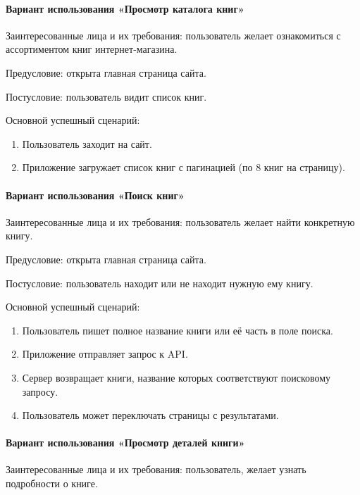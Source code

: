 \paragraph{Вариант использования «Просмотр каталога книг»}

Заинтересованные лица и их требования: пользователь желает ознакомиться с ассортиментом книг интернет-магазина.

Предусловие: открыта главная страница сайта.

Постусловие: пользователь видит список книг.

Основной успешный сценарий:

\begin{enumerate}
	\item Пользователь заходит на сайт.
	\item Приложение загружает список книг с пагинацией (по 8 книг на страницу).
\end{enumerate}


\paragraph{Вариант использования «Поиск книг»}

Заинтересованные лица и их требования: пользователь желает найти конкретную книгу.

Предусловие: открыта главная страница сайта.

Постусловие: пользователь находит или не находит нужную ему книгу.

Основной успешный сценарий:

\begin{enumerate}
	\item Пользователь пишет полное название книги или её часть в поле поиска.
	\item Приложение отправляет запрос к API. 
	\item Сервер возвращает книги, название которых соответствуют поисковому запросу.
	\item Пользователь может переключать страницы с результатами.
\end{enumerate}


\paragraph{Вариант использования «Просмотр деталей книги» }

Заинтересованные лица и их требования: пользователь, желает узнать подробности о книге.

